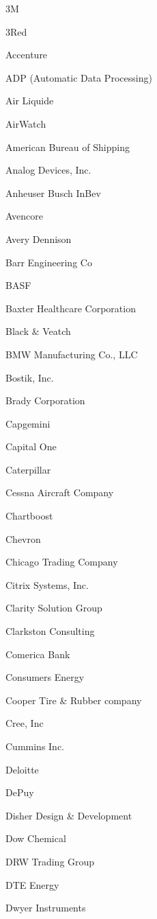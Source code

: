 \documentclass[twoside]{article}
\begin{document}
\begin{center}
\begin{multicols}{5}
        \begin{FlushLeft}
        \begin{compactitem}
        \item 3M
\item 3Red
\item Accenture
\item ADP (Automatic Data Processing)
\item Air Liquide
\item AirWatch
\item American Bureau of Shipping
\item Analog Devices, Inc.
\item Anheuser Busch InBev
\item Avencore
\item Avery Dennison
\item Barr Engineering Co
\item BASF
\item Baxter Healthcare Corporation
\item Black \& Veatch
\item BMW Manufacturing Co., LLC
\item Bostik, Inc.
\item Brady Corporation
\item Capgemini
\item Capital One
\item Caterpillar
\item Cessna Aircraft Company
\item Chartboost
\item Chevron
\item Chicago Trading Company
\item Citrix Systems, Inc.
\item Clarity Solution Group
\item Clarkston Consulting
\item Comerica Bank
\item Consumers Energy
\item Cooper Tire \& Rubber company
\item Cree, Inc
\item Cummins Inc.
\item Deloitte
\item DePuy
\item Disher Design \& Development
\item Dow Chemical
\item DRW Trading Group
\item DTE Energy
\item Dwyer Instruments

\end{compactitem}
\end{FlushLeft}
\end{multicols}
\end{center}
\end{document}
